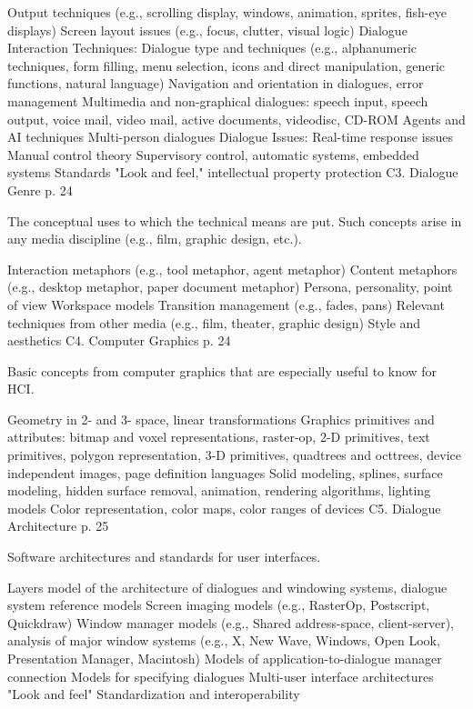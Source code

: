 Output techniques (e.g., scrolling display, windows, animation, sprites, fish-eye displays)
Screen layout issues (e.g., focus, clutter, visual logic)
Dialogue Interaction Techniques:
Dialogue type and techniques (e.g., alphanumeric techniques, form filling, menu selection, icons and direct manipulation, generic functions, natural language)
Navigation and orientation in dialogues, error management
Multimedia and non-graphical dialogues: speech input, speech output, voice mail, video mail, active documents, videodisc, CD-ROM
Agents and AI techniques
Multi-person dialogues
Dialogue Issues:
Real-time response issues
Manual control theory
Supervisory control, automatic systems, embedded systems
Standards
"Look and feel," intellectual property protection
C3. Dialogue Genre {p. 24}

The conceptual uses to which the technical means are put. Such concepts arise in any media discipline (e.g., film, graphic design, etc.).

Interaction metaphors (e.g., tool metaphor, agent metaphor)
Content metaphors (e.g., desktop metaphor, paper document metaphor)
Persona, personality, point of view
Workspace models
Transition management (e.g., fades, pans)
Relevant techniques from other media (e.g., film, theater, graphic design)
Style and aesthetics
C4. Computer Graphics {p. 24}

Basic concepts from computer graphics that are especially useful to know for HCI.

Geometry in 2- and 3- space, linear transformations
Graphics primitives and attributes: bitmap and voxel representations, raster-op, 2-D primitives, text primitives, polygon representation, 3-D primitives, quadtrees and octtrees, device independent images, page definition languages
Solid modeling, splines, surface modeling, hidden surface removal, animation, rendering algorithms, lighting models
Color representation, color maps, color ranges of devices
C5. Dialogue Architecture {p. 25}

Software architectures and standards for user interfaces.

Layers model of the architecture of dialogues and windowing systems, dialogue system reference models
Screen imaging models (e.g., RasterOp, Postscript, Quickdraw)
Window manager models (e.g., Shared address-space, client-server), analysis of major window systems (e.g., X, New Wave, Windows, Open Look, Presentation Manager, Macintosh)
Models of application-to-dialogue manager connection
Models for specifying dialogues
Multi-user interface architectures "Look and feel"
Standardization and interoperability

